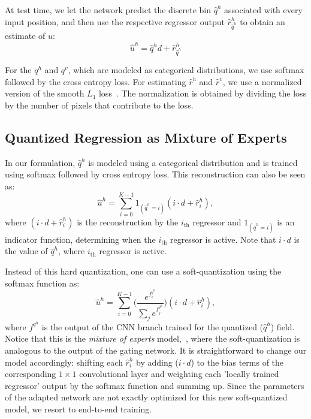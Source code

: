 At test time, we let the network predict the discrete bin $\hat{q}^h$ associated with every input position, and then use the respective regressor output $\hat{r}^h_{\hat{q}^h}$ to obtain an estimate of $u$:
\begin{equation}   
\hat{u}^h =  \hat{q}^h d + \hat{r}^h_{\hat{q}^h}
\end{equation}

For the $q^h$ and $q^v$, which are modeled as categorical distributions,  we use  softmax followed by the cross entropy loss. For estimating $\hat{r}^h$ and $\hat{r}^v$, we use a normalized version of the smooth $L_1$ loss~\cite{girshick2015fast}. The normalization is obtained by dividing the loss by the number of pixels that contribute to the loss.


\subsection{Quantized Regression as Mixture of Experts}
\label{sec:MOE}

In our formulation,  $\hat{q}^h$ is modeled using a categorical distribution and is trained using softmax followed by cross entropy loss. This reconstruction can also be seen as:
\begin{equation}
\hat{u}^h = \sum_{i=0}^{K-1}  1_{(\hat{q}^h=i)}  (  i \cdot d + \hat{r}^h_{i}),
\end{equation}
where $(  i \cdot d + \hat{r}^h_{i})$ is the reconstruction by the $i_{\mathrm{th}}$ regressor and $1_{(\hat{q}^h=i)}$ is an indicator function, determining when the $i_{\mathrm{th}}$ regressor is active. Note that $i \cdot d$ is the value of $\hat{q}^h$, where $i_{\mathrm{th}}$ regressor is active.

Instead of this hard quantization, one can use a soft-quantization using the softmax function as:
\begin{equation}
\hat{u}^h = \sum_{i=0}^{K-1}  \bigg( \frac{e^{f^{q^h}_i}}{\sum_j e^{f^{q^h}_j}}   \bigg)  ( i \cdot d + \hat{r}^h_{i}),
\end{equation}
where $f^{q^h}$ is the output of the CNN branch trained for the quantized ($\hat{q}^h$) field. Notice that this is the \textit{mixture of experts} model,~\cite{JordanJ94}, where the soft-quantization is analogous to the output of the gating network. It is straightforward to change our model accordingly: shifting each $\hat{r}^h_{i}$ by adding ($i \cdot d$) to the bias terms of the corresponding $1\times1$  convolutional layer and weighting each 'locally trained regressor' output by the softmax function and summing up. Since the parameters of the adapted network are not exactly optimized for this new soft-quantized model, we resort to end-to-end training. 

